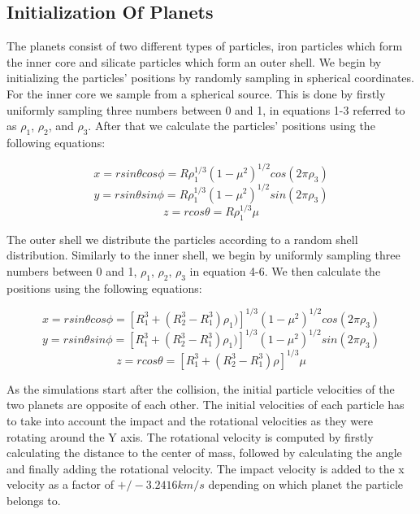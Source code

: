 \documentclass[a4paper]{article}
\begin{document}
\subsection{Initialization Of Planets}

The planets consist of two different types of particles, iron particles which form the inner core and silicate particles which form an outer shell. 
We begin by initializing the particles' positions by randomly sampling in spherical coordinates. 
For the inner core we sample from a spherical source. 
This is done by firstly uniformly sampling three numbers between 0 and 1, in equations 1-3 referred to as $\rho_1$, $\rho_2$, and $\rho_3$. 
After that we calculate the particles' positions using the following equations:

\begin{equation}
x = rsin\theta cos\phi = R\rho^{1/3}_{1}(1-\mu^{2})^{1/2}cos(2\pi\rho_{3})
\end{equation}
\begin{equation}
y = rsin\theta sin\phi = R\rho^{1/3}_{1}(1-\mu^{2})^{1/2}sin(2\pi\rho_{3})
\end{equation}
\begin{equation}
z = rcos\theta = R\rho^{1/3}_{1}\mu
\end{equation}

The outer shell we distribute the particles according to a random shell distribution. 
Similarly to the inner shell, we begin by uniformly sampling three numbers between 0 and 1, $\rho_1$, $\rho_2$, $\rho_3$ in equation 4-6. 
We then calculate the positions using the following equations:

\begin{equation}
x = rsin\theta cos\phi = [R^3_1 + (R^3_2 - R^3_1)\rho_1)]^{1/3}(1 - \mu^2)^{1/2}cos(2\pi\rho_3)
\end{equation}
\begin{equation}
y = rsin\theta sin\phi = [R^3_1 + (R^3_2 - R^3_1)\rho_1)]^{1/3}(1 - \mu^2)^{1/2}sin(2\pi\rho_3)
\end{equation}
\begin{equation}
z = rcos\theta = [R^3_1 + (R^3_2 - R^3_1)\rho]^{1/3}\mu
\end{equation}


As the simulations start after the collision, the initial particle velocities of the two planets are opposite of each other. 
The initial velocities of each particle has to take into account the impact and the rotational velocities as they were rotating around the Y axis. 
The rotational velocity is computed by firstly calculating the distance to the center of mass, followed by calculating the angle and finally adding the rotational velocity. 
The impact velocity is added to the x velocity as a factor of $+/- 3.2416 km/s$ depending on which planet the particle belongs to.
\end{document}
